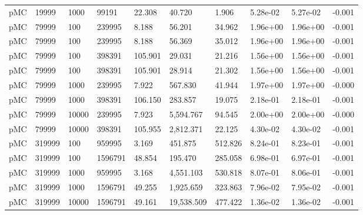 \begin{tabular}{llllllllll}
 pMC &  19999 &       1000 &       99191 &    22.308 &                       40.720 &          1.906 &         5.28e-02 &        5.27e-02 &       -0.001 \\
 pMC &  79999 &        100 &      239995 &     8.188 &                       56.201 &         34.962 &         1.96e+00 &        1.96e+00 &       -0.001 \\
 pMC &  79999 &        100 &      239995 &     8.188 &                       56.369 &         35.012 &         1.96e+00 &        1.96e+00 &       -0.001 \\
 pMC &  79999 &        100 &      398391 &   105.901 &                       29.031 &         21.216 &         1.56e+00 &        1.56e+00 &       -0.001 \\
 pMC &  79999 &        100 &      398391 &   105.901 &                       28.914 &         21.302 &         1.56e+00 &        1.56e+00 &       -0.001 \\
 pMC &  79999 &       1000 &      239995 &     7.922 &                      567.830 &         41.944 &         1.97e+00 &        1.97e+00 &       -0.000 \\
 pMC &  79999 &       1000 &      398391 &   106.150 &                      283.857 &         19.075 &         2.18e-01 &        2.18e-01 &       -0.001 \\
 pMC &  79999 &      10000 &      239995 &     7.923 &                    5,594.767 &         94.545 &         2.00e+00 &        2.00e+00 &       -0.000 \\
 pMC &  79999 &      10000 &      398391 &   105.955 &                    2,812.371 &         22.125 &         4.30e-02 &        4.30e-02 &       -0.001 \\
 pMC & 319999 &        100 &      959995 &     3.169 &                      451.875 &        512.826 &         8.24e-01 &        8.23e-01 &       -0.001 \\
 pMC & 319999 &        100 &     1596791 &    48.854 &                      195.470 &        285.058 &         6.98e-01 &        6.97e-01 &       -0.001 \\
 pMC & 319999 &       1000 &      959995 &     3.168 &                    4,551.103 &        530.818 &         8.07e-01 &        8.06e-01 &       -0.001 \\
 pMC & 319999 &       1000 &     1596791 &    49.255 &                    1,925.659 &        323.863 &         7.96e-02 &        7.95e-02 &       -0.001 \\
 pMC & 319999 &      10000 &     1596791 &    49.161 &                   19,538.509 &        477.422 &         1.36e-02 &        1.36e-02 &       -0.001 \\

\end{tabular}
